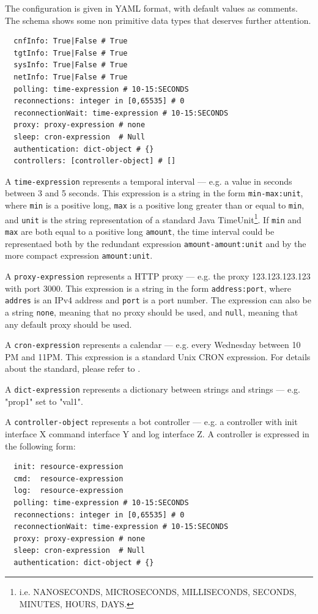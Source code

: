 The configuration is given in YAML format, with default values as comments. The schema shows some non primitive data types that deserves further attention.

\begin{verbatim}
  cnfInfo: True|False # True
  tgtInfo: True|False # True
  sysInfo: True|False # True
  netInfo: True|False # True
  polling: time-expression # 10-15:SECONDS
  reconnections: integer in [0,65535] # 0
  reconnectionWait: time-expression # 10-15:SECONDS
  proxy: proxy-expression # none
  sleep: cron-expression  # Null
  authentication: dict-object # {}
  controllers: [controller-object] # []
\end{verbatim}

A \texttt{time-expression} represents a temporal interval — e.g. a value in seconds between 3 and 5 seconds. This expression is a string in the form \texttt{min-max:unit}, where \texttt{min} is a positive long, \texttt{max} is a positive long greater than or equal to \texttt{min}, and \texttt{unit} is the string representation of a standard Java TimeUnit\footnote{i.e. NANOSECONDS, MICROSECONDS, MILLISECONDS, SECONDS, MINUTES, HOURS, DAYS.}. If \texttt{min} and \texttt{max} are both equal to a positive long \texttt{amount}, the time interval could be representaed both by the redundant expression \texttt{amount-amount:unit} and by the more compact expression \texttt{amount:unit}.

A \texttt{proxy-expression} represents a HTTP proxy — e.g. the proxy 123.123.123.123 with port 3000. This expression is a string in the form \texttt{address:port}, where \texttt{addres} is an IPv4 address and \texttt{port} is a port number. The expression can also be a string \texttt{none}, meaning that no proxy should be used, and \texttt{null}, meaning that any default proxy should be used.

A \texttt{cron-expression} represents a calendar — e.g. every Wednesday between 10 PM and 11PM. This expression is a standard Unix CRON expression. For details about the standard, please refer to \cite{cron-expression}.

A \texttt{dict-expression} represents a dictionary between strings and strings — e.g. "prop1" set to "val1".

A \texttt{controller-object} represents a bot controller — e.g. a controller with init interface X command interface Y and log interface Z. A controller is expressed in the following form:

\begin{verbatim}
  init: resource-expression
  cmd:  resource-expression
  log:  resource-expression
  polling: time-expression # 10-15:SECONDS
  reconnections: integer in [0,65535] # 0
  reconnectionWait: time-expression # 10-15:SECONDS
  proxy: proxy-expression # none
  sleep: cron-expression  # Null
  authentication: dict-object # {}
\end{verbatim}

